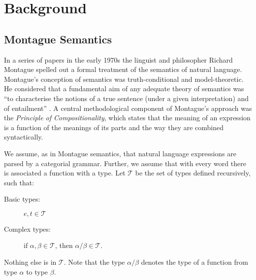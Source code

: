\documentclass[11pt]{article}
\theoremstyle{definition}
\begin{document}

\section{Background}

\subsection{Montague Semantics}

In a series of papers in the early 1970s \cite{Montague1970a,Montague1970b,Montague1973} the linguist and philosopher Richard Montague spelled out a formal treatment of the semantics of natural language. Montague's conception of semantics was truth-conditional and model-theoretic. He considered that a fundamental aim of any adequate theory of semantics was ``to characterise the notions of a true sentence (under a given interpretation) and of entailment'' \cite{Montague1970b}. A central methodological component of Montague's approach was the {\em Principle of Compositionality\/}, which states that the meaning of an expression is a function of the meanings of its parts and the way they are combined syntactically.


We assume, as in Montague semantics, that natural language expressions
are parsed by a categorial grammar. Further, we assume that with every word there is
associated a function with a type. Let $\mathcal{T}$ be the set of types defined
recursively, such that:
\begin{description}
\item [Basic types:] $e,t\in \mathcal{T}$
\item[Complex types:]  if $\alpha, \beta\in \mathcal{T}$, then $\alpha/\beta\in \mathcal{T}$.
\end{description}
Nothing else is in $\mathcal{T}$. Note that the type $\alpha/\beta$ denotes the type of a function from type
$\alpha$ to type $\beta$.
\end{document}
